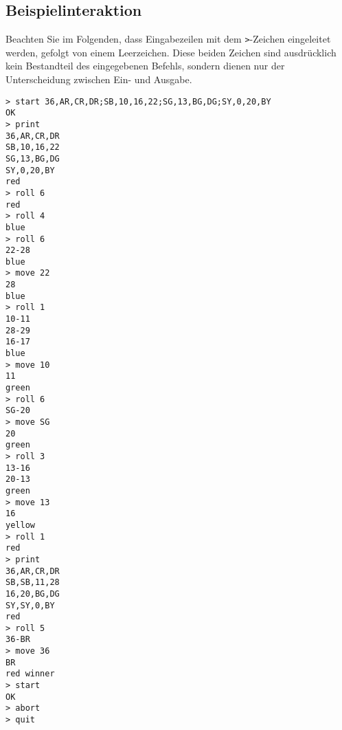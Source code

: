 \documentclass[
  name=\assignment,
  start=\releasedate,
  end=\duedate,
  subject=\lecture\,--\,\semester,
  group=\group,
  url=\theurl,
  author=\authors,
  mail=\themail
]{assignment}
\begin{document}
\subsection*{Beispielinteraktion}
Beachten Sie im Folgenden, dass Eingabezeilen mit dem \texttt{>}-Zeichen eingeleitet werden, gefolgt von einem Leerzeichen. Diese beiden Zeichen sind ausdrücklich kein Bestandteil des eingegebenen Befehls, sondern dienen nur der Unterscheidung zwischen Ein- und Ausgabe.

\begin{tcolorbox}[title=Beispiel]
\begin{verbatim}
> start 36,AR,CR,DR;SB,10,16,22;SG,13,BG,DG;SY,0,20,BY
OK
> print
36,AR,CR,DR
SB,10,16,22
SG,13,BG,DG
SY,0,20,BY
red
> roll 6
red
> roll 4
blue
> roll 6
22-28
blue
> move 22
28
blue
> roll 1
10-11
28-29
16-17
blue
> move 10
11
green
> roll 6
SG-20
> move SG
20
green
> roll 3
13-16
20-13
green
> move 13
16
yellow
> roll 1
red
> print
36,AR,CR,DR
SB,SB,11,28
16,20,BG,DG
SY,SY,0,BY
red
> roll 5
36-BR
> move 36
BR
red winner
> start
OK
> abort
> quit
\end{verbatim}
\end{tcolorbox}
\end{document}
